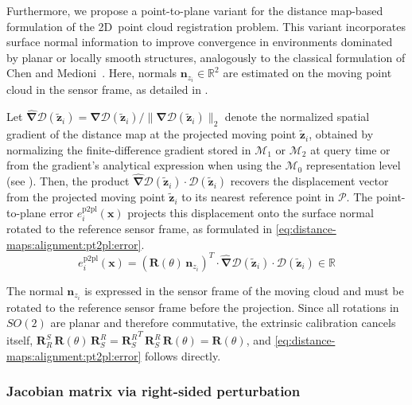 Furthermore, we propose a point-to-plane variant for the distance map-based
formulation of the 2D~point cloud registration problem.
This variant  incorporates surface normal information to improve
convergence in environments dominated by planar or locally smooth structures,
analogously to the classical formulation of
Chen and Medioni~\cite{chen-medioni:icra:1991}.
Here, normals $\mathbf{n}_{z_i} \in \mathbb{R}^2$ are estimated
on the moving point cloud in the sensor frame, as detailed in
.

Let $\hat{\bm{\nabla}}\mathcal{D}\!\left(\tilde{\mathbf{z}}_i\right) =
\bm{\nabla}\mathcal{D}\!\left(\tilde{\mathbf{z}}_i\right) /
\|\bm{\nabla}\mathcal{D}\!\left(\tilde{\mathbf{z}}_i\right)\|_2$
denote the normalized spatial gradient of the distance map at the projected
moving point $\tilde{\mathbf{z}}_i$, obtained by normalizing the finite-difference
gradient stored in $\mathcal{M}_1$ or $\mathcal{M}_2$ at query time or from
the gradient's analytical expression when using the $\mathcal{M}_0$
representation level (see ).
Then, the product
$\hat{\bm{\nabla}}\mathcal{D}\!\left(\tilde{\mathbf{z}}_i\right)
\cdot \mathcal{D}\!\left(\tilde{\mathbf{z}}_i\right)$
recovers the displacement vector from the projected moving point
$\tilde{\mathbf{z}}_i$ to its nearest reference point in $\mathcal{P}$.
The point-to-plane error $e_i^{\mathrm{p2pl}}(\mathbf{x})$ projects this displacement onto
the surface normal rotated to the reference sensor frame, as formulated in
\eqref{eq:distance-maps:alignment:pt2pl:error}.
\begin{equation}
\label{eq:distance-maps:alignment:pt2pl:error}
e_i^{\mathrm{p2pl}}(\mathbf{x}) =
\left(\mathbf{R}(\theta)\,\mathbf{n}_{z_i}\right)^T \cdot
\hat{\bm{\nabla}}\mathcal{D}\!\left(\tilde{\mathbf{z}}_i\right) \cdot
\mathcal{D}\!\left(\tilde{\mathbf{z}}_i\right) \in \mathbb{R}
\end{equation}

The normal $\mathbf{n}_{z_i}$ is expressed in the sensor frame of
the moving cloud and must be rotated to the reference sensor frame before
the projection. Since all rotations in $SO(2)$ are planar and therefore
commutative, the extrinsic calibration cancels itself,
$\mathbf{R}_R^S\,\mathbf{R}(\theta)\,\mathbf{R}_S^R =
{\mathbf{R}_S^R}^T\,\mathbf{R}_S^R\,\mathbf{R}(\theta) = \mathbf{R}(\theta)$,
and \eqref{eq:distance-maps:alignment:pt2pl:error} follows directly.

\subsubsection{Jacobian matrix via right-sided perturbation}
\label{sec:distance-maps:alignment:pt2pl:jacobian}

